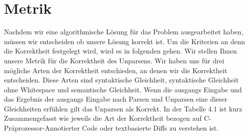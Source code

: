 \chapter{Metrik}




Nachdem wir eine algorithmische Lösung für das Problem ausgearbeitet haben, müssen wir entscheiden ob unsere Lösung korrekt ist. Um die Kriterien an denn die Korrektheit festgelegt wird, wird es in folgenden gehen. Wir stellen Ihnen unsere Metrik für die Korrektheit des Unparsens. Wir haben uns für drei mögliche Arten der Korrektheit entschieden, an denen wir die Korrektheit entscheiden. Diese Arten sind syntaktische Gleichheit, syntaktische Gleichheit ohne Whitespace und semantische Gleichheit. Wenn die ausgangs Eingabe und das Ergebnis der ausgangs Eingabe nach Parsen und Unparsen eine dieser Gleichheiten erfühlen gilt das Unparsen als Korrekt.  In der Tabelle 4.1 ist kurz Zusammengefasst wie jeweils die Art der Korrektheit bezogen auf C-Präprozessor-Annotierter Code oder textbasierte Diffs zu verstehen ist.



